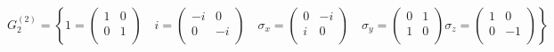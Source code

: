 \documentclass{article}
\begin{document}
\begin{CJK*}{GBK}{song}
\begin{equation}
G_2^{(2)}=\left\{
1=
\begin{pmatrix}
     1  &  0 \\
     0  &  1 \\
\end{pmatrix}\quad
i=
\begin{pmatrix}
     -i  &  0 \\
     0  &  -i \\
\end{pmatrix}\quad
\sigma_x=
\begin{pmatrix}
     0  &  -i \\
     i   &  0 \\
\end{pmatrix}\quad
\sigma_y=
\begin{pmatrix}
     0  &  1 \\
     1  &  0 \\
\end{pmatrix}
\sigma_z=
\begin{pmatrix}
     1  &  0 \\
     0  & -1 \\
\end{pmatrix}
\right\}
\end{equation}










\end{CJK*}
\end{document}
